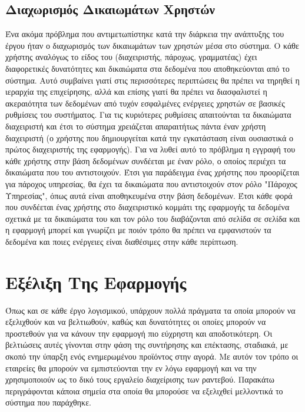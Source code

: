 \subsection{Διαχωρισμός Δικαιωμάτων Χρηστών}
Ένα ακόμα πρόβλημα που αντιμετωπίστηκε κατά την διάρκεια την ανάπτυξης του έργου ήταν ο διαχωρισμός των δικαιωμάτων των χρηστών μέσα στο σύστημα. Ο κάθε χρήστης αναλόγως το είδος του (διαχειριστής, πάροχως, γραμματέας) έχει διαφορετικές δυνατότητες και δικαιώματα στα δεδομένα που αποθηκεύονται από το σύστημα. Αυτό συμβαίνει γιατί στις περισσότερες περιπτώσεις θα πρέπει να τηρηθεί η ιεραρχία της επιχείρησης, αλλά και επίσης γιατί θα πρέπει να διασφαλιστεί η ακεραιότητα των δεδομένων από τυχόν εσφαλμένες ενέργειες χρηστών σε βασικές ρυθμίσεις του συστήματος. Για τις κυριότερες ρυθμίσεις απαιτούνται τα δικαιώματα διαχειριστή και έτσι το σύστημα χρειάζεται απαραιτήτως πάντα έναν χρήστη διαχειριστή (ο χρήστης που δημιουργείται κατά την εγκατάσταση είναι ουσιαστικά ο πρώτος διαχειριστής της εφαρμογής). Για να λυθεί αυτό το πρόβλημα η εγγραφή του κάθε χρήστης στην βάση δεδομένων συνδέεται με έναν ρόλο, ο οποίος περιέχει τα δικαιώματα που του αντιστοιχούν. Έτσι για παράδειγμα ένας χρήστης που προορίζεται για πάροχος υπηρεσίας, θα έχει τα δικαιώματα που αντιστοιχούν στον ρόλο "Πάροχος Υπηρεσίας", όπως αυτά είναι αποθηκευμένα στην βάση δεδομένων. Έτσι κάθε φορά που συνδέεται ένας χρήστης στο διαχειριστικό κομμάτι της εφαρμογής τα δεδομένα σχετικά με τα δικαιώματα του και τον ρόλο του διαβάζονται από σελίδα σε σελίδα και η εφαρμογή μπορεί και γνωρίζει με ποιόν τρόπο θα πρέπει να εμφανιστούν τα δεδομένα και ποιες ενέργειες είναι διαθέσιμες στην κάθε περίπτωση.

\section{Εξέλιξη Της Εφαρμογής}
Όπως και σε κάθε έργο λογισμικού, υπάρχουν πολλά πράγματα τα οποία μπορούν να εξελιχθούν και να βελτιωθούν, καθώς και δυνατότητες οι οποίες μπορούν να προστεθούν για να κάνουν την εφαρμογή πιο εύχρηστη και αποδοτικότερη. Οι βελτιώσεις αυτές γίνονται στην φάση της συντήρησης και επέκτασης, σταδιακά, με σκοπό την ύπαρξη ενός ενημερωμένου προϊόντος στην αγορά. Με αυτόν τον τρόπο οι εταιρείες θα μπορούν να εμπιστεύονται την εν λόγω εφαρμογή και να την χρησιμοποιούν ως το δικό τους εργαλείο διαχείρισης των ραντεβού. Παρακάτω περιγράφονται κάποια σημεία στα οποία θα μπορούσε να εξελιχθεί μελλοντικά το σύστημα που παράχθηκε.


